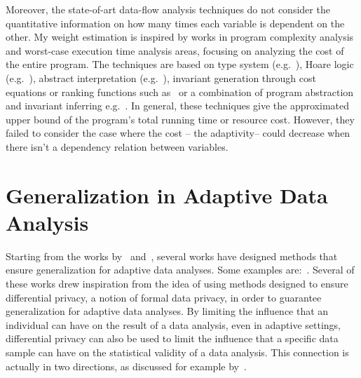 Moreover, the state-of-art data-flow analysis techniques do not
consider the quantitative information on how many times each variable is dependent on the other. 
My weight estimation is inspired by
works in program complexity analysis and worst-case execution time analysis areas, 
focusing on analyzing the cost of the entire program. 
The techniques are based on
type system (e.g.~\cite{CicekBG0H17, RajaniG0021}), Hoare logic (e.g.~\cite{CarbonneauxHS15}), abstract interpretation (e.g.~\cite{GustafssonEL05, HumenbergerJK18}),
invariant generation through cost equations or ranking functions such as~\cite{BrockschmidtEFFG16,AlbertAGP08,AliasDFG10,Flores-MontoyaH14}
or a combination of program abstraction and invariant inferring e.g.~\cite{GulwaniZ10, SinnZV17,GulwaniJK09}.
In general, these techniques give the approximated upper bound of the program's total running time or resource cost.
However, they failed to consider the case where the cost -- the adaptivity-- could decrease when there isn't a dependency relation between variables.

\section{Generalization in Adaptive Data Analysis}
\label{sec:relatedwork-adapt-error}
Starting from the works by~\citet{DworkFHPRR15} and~\citet{HardtU14}, several works have designed methods that ensure generalization for adaptive data analyses.
Some examples
are:~\cite{stoc/DworkFHPRR15, DworkFHPRR15,
BassilyNSSSU16, UllmanSNSS18, FeldmanS17, 0001LN0SS21, SteinkeZ20, RogersRSSTW20}.
Several of these works drew inspiration from the idea of using methods designed to ensure differential privacy, a notion of formal data privacy, in order to guarantee generalization for adaptive data analyses.
By limiting the influence that an individual can have on the result of a data analysis, even in adaptive settings, differential privacy can also be used to limit the influence that a specific data sample can have on the statistical validity of a data analysis.
This connection is actually in two directions, as discussed for example by~\citet{YeomGFJ18}.

